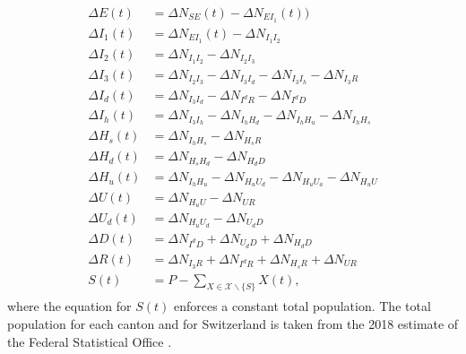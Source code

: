 \begin{gather}
\label{eq:stochstates}
\begin{aligned}
    \Delta E(t) &= \Delta N_{SE}(t) - \Delta N_{EI_1}(t))\\
    \Delta I_1(t) &= \Delta N_{EI_1}(t) - \Delta N_{I_1 I_2}\\
    \Delta I_2(t) &= \Delta N_{I_1 I_2} - \Delta N_{I_2 I_3}\\
    \Delta I_3(t) &=  \Delta N_{I_2 I_3} - \Delta N_{I_3 I_d} - \Delta N_{I_3 I_h} -  \Delta N_{I_3 R}\\
    \Delta I_d(t) &= \Delta N_{I_3 I_d} - \Delta N_{I^d R} - \Delta N_{I^d D}\\
    \Delta I_h(t) &= \Delta N_{I_3 I_h} -  \Delta N_{I_h H_d} -  \Delta N_{I_h H_u} -  \Delta N_{I_h H_s} \\
    \Delta H_s(t) &= \Delta N_{I_h H_s} -  \Delta N_{H_s R}\\
   \Delta H_d(t) &= \Delta N_{H_s H_d} -  \Delta N_{H_d D}\\
    \Delta H_u(t) &= \Delta N_{I_h H_u} - \Delta N_{H_u U_d} - \Delta N_{H_u U_a} - \Delta N_{H_u U}\\
    \Delta U(t) &=  \Delta N_{H_u U} - \Delta N_{U R}\\
    \Delta U_d(t) &=  \Delta N_{H_u U_d} - \Delta N_{U_d D}\\
    \Delta D(t) &=  \Delta N_{I^d D} + \Delta N_{U_d D} + \Delta N_{H_d D}\\
    \Delta R(t) &= \Delta N_{I_3 R} + \Delta N_{I^d R} +  \Delta N_{H_s R} + \Delta N_{U R} \\
     S(t) &= P - \sum_{X \in \mathcal{X} \backslash \{S\}} X(t),
\end{aligned}
\end{gather}
where the equation for \(S(t)\) enforces a constant total population. The total population for each canton and for Switzerland is taken from the 2018 estimate of the Federal Statistical Office \cite{office_federal_de_la_statistique_population_2018}.


